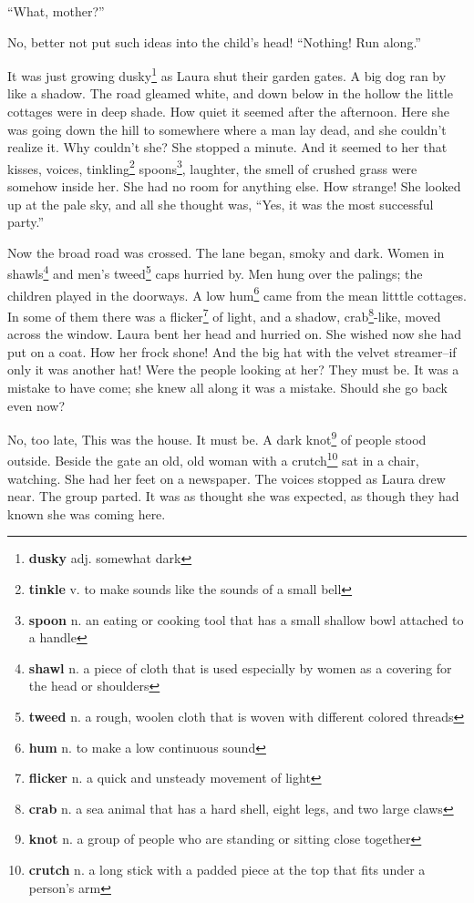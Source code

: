 ``What, mother?''

No, better not put such ideas into the child's head! ``Nothing! Run along.''

It was just growing dusky\footnote{\textbf{dusky} adj. somewhat dark} as Laura shut their garden gates. A big dog ran by like a shadow. The road gleamed white, and down below in the hollow the little cottages were in deep shade. How quiet it seemed after the afternoon. Here she was going down the hill to somewhere where a man lay dead, and she couldn't realize it. Why couldn't she? She stopped a minute. And it seemed to her that kisses, voices, tinkling\footnote{\textbf{tinkle} v. to make sounds like the sounds of a small bell} spoons\footnote{\textbf{spoon} n. an eating or cooking tool that has a small shallow bowl attached to a handle}, laughter, the smell of crushed grass were somehow inside her. She had no room for anything else. How strange! She looked up at the pale sky, and all she thought was, ``Yes, it was the most successful party.''

Now the broad road was crossed. The lane began, smoky and dark. Women in shawls\footnote{\textbf{shawl} n. a piece of cloth that is used especially by women as a covering for the head or shoulders} and men's tweed\footnote{\textbf{tweed} n. a rough, woolen cloth that is woven with different colored threads} caps hurried by. Men hung over the palings; the children played in the doorways. A low hum\footnote{\textbf{hum} n. to make a low continuous sound} came from the mean litttle cottages. In some of them there was a flicker\footnote{\textbf{flicker} n. a quick and unsteady movement of light} of light, and a shadow, crab\footnote{\textbf{crab} n. a sea animal that has a hard shell, eight legs, and two large claws}-like, moved across the window. Laura bent her head and hurried on. She wished now she had put on a coat. How her frock shone! And the big hat with the velvet streamer--if only it was another hat! Were the people looking at her? They must be. It was a mistake to have come; she knew all along it was a mistake. Should she go back even now?

No, too late, This was the house. It must be. A dark knot\footnote{\textbf{knot} n. a group of people who are standing or sitting close together} of people stood outside. Beside the gate an old, old woman with a crutch\footnote{\textbf{crutch} n. a long stick with a padded piece at the top that fits under a person's arm} sat in a chair, watching. She had her feet on a newspaper. The voices stopped as Laura drew near. The group parted. It was as thought she was expected, as though they had known she was coming here.

